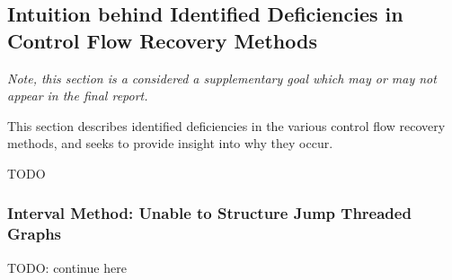 
\subsection{Intuition behind Identified Deficiencies in Control Flow Recovery Methods}

\textit{Note, this section is a considered a supplementary goal which may or may not appear in the final report.}

This section describes identified deficiencies in the various control flow recovery methods, and seeks to provide insight into why they occur.

TODO


\subsubsection{Interval Method: Unable to Structure Jump Threaded Graphs}

TODO: continue here
